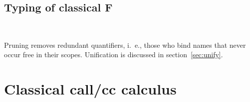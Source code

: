 \documentclass{amsart}
\begin{document}
\subsection{Typing of classical F}
~

\nc{}

\nc{}

\nc{}

\nc{}

\nc{}

\nc{}

\nc{}

\Tautology

\UniversalNegation

\ExistentialNegation

\SuperIntroduction

\SuperElimination

Pruning removes redundant quantifiers, i.~e., those who bind
names that never occur free in their scopes. Unification is
discussed in section~\ref{sec:unify}.

\UniversalIntroduction

\ExistentialIntroduction

\section{Classical call/cc calculus}
\end{document}
